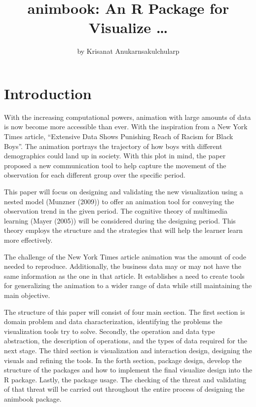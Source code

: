 \title{animbook: An R Package for Visualize \ldots{}}
\author{by Krisanat Anukarnsakulchularp}

\maketitle


\hypertarget{introduction}{%
\section{Introduction}\label{introduction}}

With the increasing computational powers, animation with large amounts of data is now become more accessible than ever. With the inspiration from a New York Times article, ``Extensive Data Shows Punishing Reach of Racism for Black Boys''. The animation portrays the trajectory of how boys with different demographics could land up in society. With this plot in mind, the paper proposed a new communication tool to help capture the movement of the observation for each different group over the specific period.

This paper will focus on designing and validating the new visualization using a nested model (Munzner (2009)) to offer an animation tool for conveying the observation trend in the given period. The cognitive theory of multimedia learning (Mayer (2005)) will be considered during the designing period. This theory employs the structure and the strategies that will help the learner learn more effectively.

The challenge of the New York Times article animation was the amount of code needed to reproduce. Additionally, the business data may or may not have the same information as the one in that article. It establishes a need to create tools for generalizing the animation to a wider range of data while still maintaining the main objective.

The structure of this paper will consist of four main section. The first section is domain problem and data characterization, identifying the problems the visualization tools try to solve. Secondly, the operation and data type abstraction, the description of operations, and the types of data required for the next stage. The third section is visualization and interaction design, designing the visuals and refining the tools. In the forth section, package design, develop the structure of the packages and how to implement the final visualize design into the R package. Lastly, the package usage. The checking of the threat and validating of that threat will be carried out throughout the entire process of designing the animbook package.

